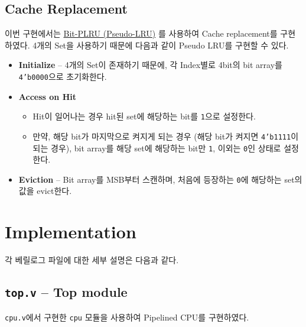 \documentclass{scrartcl}
\begin{document}
\subsection{Cache Replacement}
이번 구현에서는 \href{https://en.wikipedia.org/wiki/Pseudo-LRU}{Bit-PLRU (Pseudo-LRU)} 를 사용하여 Cache replacement를 구현하였다.
4개의 Set을 사용하기 때문에 다음과 같이 Pseudo LRU를 구현할 수 있다.
\begin{itemize}
  \item \textbf{Initialize} -- 4개의 Set이 존재하기 때문에, 각 Index별로 4bit의 bit array를 \texttt{4'b0000}으로 초기화한다.
  \item \textbf{Access on Hit}
  \begin{itemize}
    \item Hit이 일어나는 경우 hit된 set에 해당하는 bit를 \texttt{1}으로 설정한다.
    \item 만약, 해당 bit가 마지막으로 켜지게 되는 경우 (해당 bit가 켜지면 \texttt{4'b1111}이 되는 경우),
    bit array를 해당 set에 해당하는 bit만 \texttt{1}, 이외는 \texttt{0}인 상태로 설정한다.
  \end{itemize}
  \item \textbf{Eviction} -- Bit array를 MSB부터 스캔하며, 처음에 등장하는 \texttt{0}에 해당하는 set의 값을 evict한다.
\end{itemize}

\section{Implementation}
각 베릴로그 파일에 대한 세부 설명은 다음과 같다.

\subsection{\texttt{top.v} -- Top module}
\texttt{cpu.v}에서 구현한 \texttt{cpu} 모듈을 사용하여 Pipelined CPU를 구현하였다.
\end{document}
